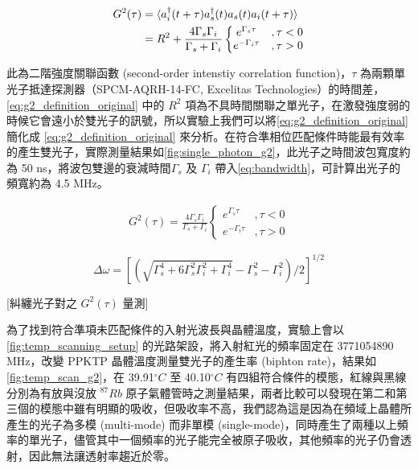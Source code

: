 \documentclass[class=NCU_thesis, crop=false]{standalone}
\begin{document}
\begin{equation}
\begin{split}
    G^{2}(\tau)&=\braket{a^{\dagger}_{i}(t+\tau)a^{\dagger}_{s}(t)a_{s}(t)a_{i}(t+\tau)}\\
    &=R^2+\frac{4\Gamma_{s}\Gamma_{i}}{\Gamma_{s}+\Gamma_{i}}\left\{\begin{matrix}
        e^{\Gamma_{s}\tau} & ,\tau<0\\
        e^{-\Gamma_{i}\tau} & ,\tau>0
        \end{matrix}\right.
\label{eq:g2_definition_original}
\end{split}
\end{equation}

此為二階強度關聯函數 (second-order intenstiy correlation function)，$\tau$ 為兩顆單光子抵達探測器（SPCM-AQRH-14-FC, Excelitas Technologies）的時間差，\cref{eq:g2_definition_original} 中的 $R^2$ 項為不具時間關聯之單光子，在激發強度弱的時候它會遠小於雙光子的訊號，所以實驗上我們可以將\cref{eq:g2_definition_original} 簡化成 \cref{eq:g2_definition_original} 來分析。在符合準相位匹配條件時能最有效率的產生雙光子，實際測量結果如\cref{fig:single_photon_g2}，此光子之時間波包寬度約為 50 ns，將波包雙邊的衰減時間$\Gamma_{s}$ 及 $\Gamma_{i}$ 帶入\cref{eq:bandwidth}\cite{chuu2012miniature}，可計算出光子的頻寬約為 4.5 MHz。

\begin{equation}
    \begin{split}
        G^{2}(\tau)=\frac{4\Gamma_{s}\Gamma_{i}}{\Gamma_{s}+\Gamma_{i}}\left\{\begin{matrix}
            e^{\Gamma_{s}\tau} & ,\tau<0\\
            e^{-\Gamma_{i}\tau} & ,\tau>0
            \end{matrix}\right.
    \label{eq:g2_definition}
    \end{split}
\end{equation}

\begin{equation}
        \Delta \omega=[(\sqrt{\Gamma^4_s+6\Gamma^2_s \Gamma^2_i+\Gamma^4_i}-\Gamma^2_s-\Gamma^2_i)/2]^{1/2}
    \label{eq:bandwidth}
\end{equation}

[糾纏光子對之 $G^{2}(\tau)$ 量測]

為了找到符合準項未匹配條件的入射光波長與晶體溫度，實驗上會以\cref{fig:temp_scanning_setup} 的光路架設，將入射紅光的頻率固定在 3771054890 MHz，改變 PPKTP 晶體溫度測量雙光子的產生率 (biphton rate)，結果如\cref{fig:temp_scan_g2}，在 39.91$^{\circ}C$ 至 40.10$^{\circ}C$ 有四組符合條件的模態，紅線與黑線分別為有放與沒放 $^{87}Rb$ 原子氣體管時之測量結果，兩者比較可以發現在第二和第三個的模態中雖有明顯的吸收，但吸收率不高，我們認為這是因為在頻域上晶體所產生的光子為多模 (multi-mode) 而非單模 (single-mode)，同時產生了兩種以上頻率的單光子，儘管其中一個頻率的光子能完全被原子吸收，其他頻率的光子仍會透射，因此無法讓透射率趨近於零。
\end{document}
